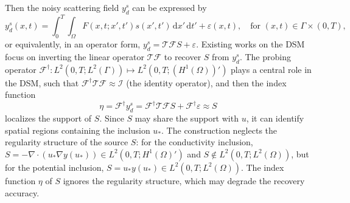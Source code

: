 \documentclass[onefignum,onetabnum]{siamart190516}
\numberwithin{equation}{section}
\begin{document}
Then the noisy scattering field $y^{s}_{d}$ can be expressed by
\begin{equation*}
y^{s}_{d}(x,t) = \int_{0}^{T} \int_{\Omega} F(x,t; x',t') s(x',t') \, \mathrm{d}x' \, \mathrm{d}t' + \varepsilon(x,t), \quad \text{for } (x,t) \in \Gamma\times(0,T),
\end{equation*}
or equivalently, in an operator form, $y^{s}_{d} = \mathcal{T}\mathcal{F}S + \varepsilon$.
Existing works \cite{Zou2015, Zou2014, Zou2022, Zou2021} on the DSM focus on inverting the linear operator $\mathcal{T}\mathcal{F}$ to recover $S$ from $y^{s}_{d}$.
The probing operator $\mathcal{F}^{\dag}\colon L^{2}(0,T; L^{2}(\Gamma)) \mapsto L^{2}(0,T; (H^{1}(\Omega))')$ plays a central role in the DSM, such that $\mathcal{F}^{\dag}\mathcal{T}\mathcal{F} \approx \mathcal{I}$ (the identity operator), and then the index function
\begin{equation*}
\eta = \mathcal{F}^{\dag}y^{s}_{d} = \mathcal{F}^{\dag}\mathcal{T}\mathcal{F}S + \mathcal{F}^{\dag}\varepsilon \approx S
\end{equation*}
localizes the support of $S$.
Since $S$ may share the support with $u$, it can identify spatial regions containing the inclusion $u_{*}$. The construction neglects the regularity structure of the source $S$:
for the conductivity inclusion, $S = -\nabla \cdot (u_{*}\nabla y(u_{*})) \in L^{2}(0,T; H^{1}(\Omega)')$ and $S \notin L^{2}(0,T; L^{2}(\Omega))$, but for the potential inclusion, $S = u_{*}y(u_{*}) \in L^{2}(0,T; L^{2}(\Omega))$.
The index function $\eta$ of $S$ ignores the regularity structure, which may degrade the recovery accuracy.
\end{document}
